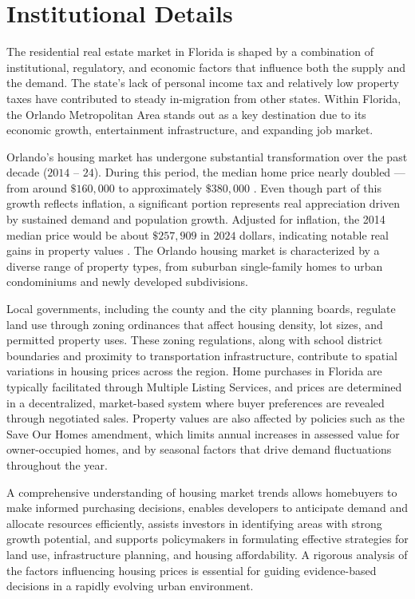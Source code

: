 \section*{Institutional Details}
The residential real estate market in Florida is shaped by a combination of institutional, regulatory, and economic factors that influence both the supply and the demand. The state’s lack of personal income tax and relatively low property taxes have contributed to steady in-migration from other states. Within Florida, the Orlando Metropolitan Area stands out as a key destination due to its economic growth, entertainment infrastructure, and expanding job market.

Orlando’s housing market has undergone substantial transformation over the past decade ($2014$ -- $24$). During this period, the median home price nearly doubled --- from around $\$160,000$ to approximately $\$380,000$ \citep{orra:2024}. Even though part of this growth reflects inflation, a significant portion represents real appreciation driven by sustained demand and population growth. Adjusted for inflation, the 2014 median price would be about $\$257,909$ in $2024$ dollars, indicating notable real gains in property values \citep{bls:2024}.
The Orlando housing market is characterized by a diverse range of property types, from suburban single-family homes to urban condominiums and newly developed subdivisions. 

Local governments, including the county and the city planning boards, regulate land use through zoning ordinances that affect housing density, lot sizes, and permitted property uses. These zoning regulations, along with school district boundaries and proximity to transportation infrastructure, contribute to spatial variations in housing prices across the region.
Home purchases in Florida are typically facilitated through Multiple Listing Services, and prices are determined in a decentralized, market-based system where buyer preferences are revealed through negotiated sales. Property values are also affected by policies such as the Save Our Homes amendment, which limits annual increases in assessed value for owner-occupied homes, and by seasonal factors that drive demand fluctuations throughout the year.

A comprehensive understanding of housing market trends allows homebuyers to make informed purchasing decisions, enables developers to anticipate demand and allocate resources efficiently, assists investors in identifying areas with strong growth potential, and supports policymakers in formulating effective strategies for land use, infrastructure planning, and housing affordability. A rigorous analysis of the factors influencing housing prices is essential for guiding evidence-based decisions in a rapidly evolving urban environment.
